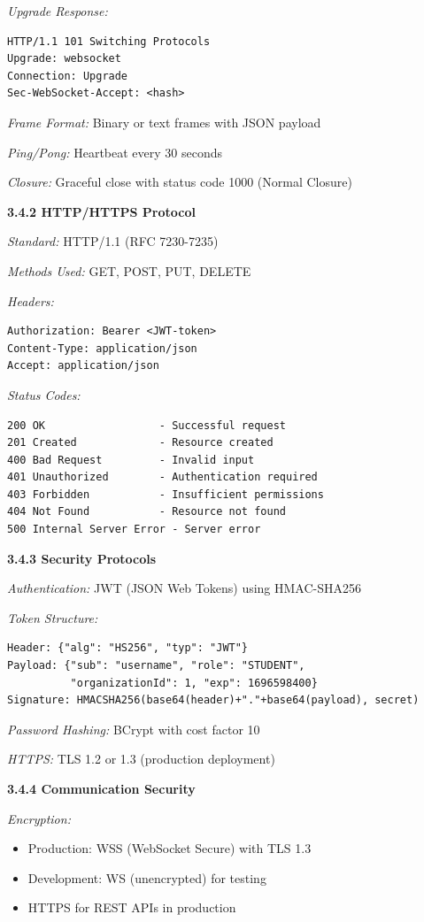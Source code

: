 \documentclass[12pt,a4paper]{article}
\begin{document}
\textit{Upgrade Response:}
\begin{verbatim}
HTTP/1.1 101 Switching Protocols
Upgrade: websocket
Connection: Upgrade
Sec-WebSocket-Accept: <hash>
\end{verbatim}

\textit{Frame Format:} Binary or text frames with JSON payload

\textit{Ping/Pong:} Heartbeat every 30 seconds

\textit{Closure:} Graceful close with status code 1000 (Normal Closure)

\textbf{3.4.2 HTTP/HTTPS Protocol}

\textit{Standard:} HTTP/1.1 (RFC 7230-7235)

\textit{Methods Used:} GET, POST, PUT, DELETE

\textit{Headers:}
\begin{verbatim}
Authorization: Bearer <JWT-token>
Content-Type: application/json
Accept: application/json
\end{verbatim}

\textit{Status Codes:}
\begin{verbatim}
200 OK                  - Successful request
201 Created             - Resource created
400 Bad Request         - Invalid input
401 Unauthorized        - Authentication required
403 Forbidden           - Insufficient permissions
404 Not Found           - Resource not found
500 Internal Server Error - Server error
\end{verbatim}

\textbf{3.4.3 Security Protocols}

\textit{Authentication:} JWT (JSON Web Tokens) using HMAC-SHA256

\textit{Token Structure:}
\begin{verbatim}
Header: {"alg": "HS256", "typ": "JWT"}
Payload: {"sub": "username", "role": "STUDENT", 
          "organizationId": 1, "exp": 1696598400}
Signature: HMACSHA256(base64(header)+"."+base64(payload), secret)
\end{verbatim}

\textit{Password Hashing:} BCrypt with cost factor 10

\textit{HTTPS:} TLS 1.2 or 1.3 (production deployment)

\textbf{3.4.4 Communication Security}

\textit{Encryption:}
\begin{itemize}[noitemsep]
    \item Production: WSS (WebSocket Secure) with TLS 1.3
    \item Development: WS (unencrypted) for testing
    \item HTTPS for REST APIs in production
\end{itemize}
\end{document}
